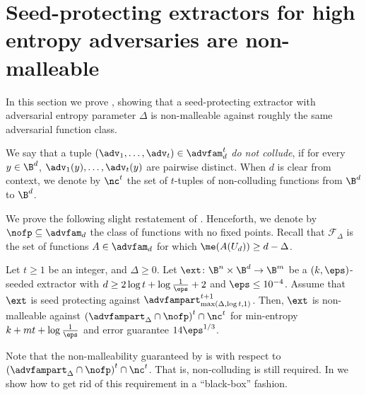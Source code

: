 \documentclass{toc}
\begin{document}
%
\section{Seed-protecting  %
extractors for high entropy adversaries are non-malleable}\label{sec:the delta proof}

In this section we prove , showing that a seed-protecting extractor with adversarial entropy parameter $\Delta$
is non-malleable against roughly the same adversarial function class.



\begin{definition}
	We say that a tuple $(\adv_1,\ldots,\adv_t) \in \advfam_d^t$ 
	\emph{do not collude}, if for every $y \in \B^d$, $\adv_1(y),\ldots,\adv_{t}(y)$ are pairwise distinct. 
	When $d$ is clear from context, we denote by $\nc^t$ the set of $t$-tuples of non-colluding
	functions from $\B^d$ to $\B^d$. %
\end{definition}



We prove the following slight restatement of . Henceforth, we denote by
$\nofp \subseteq \advfam_d$ the class of functions with no fixed points. Recall that $\mathcal{F}_{\Delta}$ is the set of functions $A \in \advfam_d$ for which $\me(A(U_d)) \ge d-\Delta$.

\begin{theorem}\label{t: sp to nm}
Let $t \ge 1$ be an integer, and $\Delta \ge 0$.
Let $\ext\colon\B^{n}\times\B^{d}\rightarrow\B^m$ be a $(k,\eps)$-seeded extractor with $d \ge 2\log{t} + \log\frac1{\eps} + 2$ and $\eps \leq 10^{-4}$. Assume that $\ext$ is seed protecting against $\advfampart^{t+1}_{\max(\Delta, \log t,1)}$. Then, $\ext$ is non-malleable against $\left(\advfampart_{\Delta} \cap \nofp\right)^t \cap \nc^t$  for min-entropy $k+mt+\log\frac1{\eps}$ and error guarantee $14 \eps^{1/3}$.
\end{theorem}

Note that the non-malleability guaranteed by  is with respect to $\left(\advfampart_{\Delta} \cap \nofp\right)^t \cap \nc^t$. That is, non-colluding is still required. In  we show how to get rid of this requirement in a ``black-box'' fashion.
\end{document}
